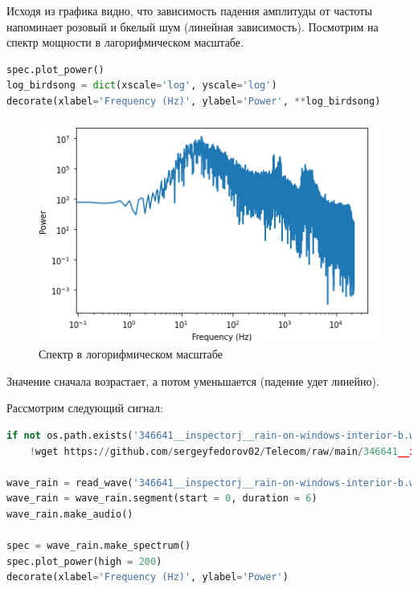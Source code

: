 Исходя из графика видно, что зависимость падения амплитуды от частоты напоминает розовый и бкелый шум (линейная зависимость). Посмотрим на спектр мощности в лагорифмическом масштабе.

\begin{lstlisting}[language=Python]
spec.plot_power()
log_birdsong = dict(xscale='log', yscale='log')
decorate(xlabel='Frequency (Hz)', ylabel='Power', **log_birdsong)
\end{lstlisting}

\begin{figure}[H]
	\begin{center}
		\includegraphics[scale=1]{fig/lab04/lab04_02.png}
		\caption{Спектр в логорифмическом масштабе}
	\end{center}
\end{figure}

Значение сначала возрастает, а потом уменьшается (падение удет линейно).

Рассмотрим следующий сигнал:

\begin{lstlisting}[language=Python]
if not os.path.exists('346641__inspectorj__rain-on-windows-interior-b.wav'):
    !wget https://github.com/sergeyfedorov02/Telecom/raw/main/346641__inspectorj__rain-on-windows-interior-b.wav
    
wave_rain = read_wave('346641__inspectorj__rain-on-windows-interior-b.wav')
wave_rain = wave_rain.segment(start = 0, duration = 6)
wave_rain.make_audio()

spec = wave_rain.make_spectrum()
spec.plot_power(high = 200)
decorate(xlabel='Frequency (Hz)', ylabel='Power')
\end{lstlisting}

